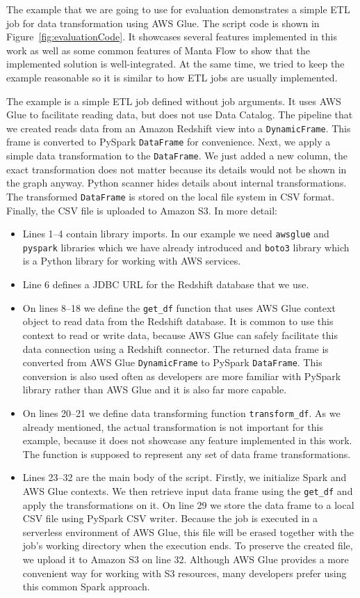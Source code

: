 The example that we are going to use for evaluation demonstrates a simple ETL job for data transformation using AWS Glue. The script code is shown in Figure~\ref{fig:evaluationCode}. It showcases several features implemented in this work as well as some common features of Manta Flow to show that the implemented solution is well-integrated. At the same time, we tried to keep the example reasonable so it is similar to how ETL jobs are usually implemented.
\par
The example is a simple ETL job defined without job arguments. It uses AWS Glue to facilitate reading data, but does not use Data Catalog. The pipeline that we created reads data from an Amazon Redshift view into a \texttt{DynamicFrame}. This frame is converted to PySpark \texttt{DataFrame} for convenience. Next, we apply a simple data transformation to the \texttt{DataFrame}. We just added a new column, the exact transformation does not matter because its details would not be shown in the graph anyway. Python scanner hides details about internal transformations. The transformed \texttt{DataFrame} is stored on the local file system in CSV format. Finally, the CSV file is uploaded to Amazon S3. In more detail:
\begin{itemize}
    \item Lines 1--4 contain library imports. In our example we need \texttt{awsglue} and \texttt{pyspark} libraries which we have already introduced and \texttt{boto3} library which is a Python library for working with AWS services.
    \item Line 6 defines a JDBC URL for the Redshift database that we use.
    \item On lines 8--18 we define the \texttt{get\_df} function that uses AWS Glue context object to read data from the Redshift database. It is common to use this context to read or write data, because AWS Glue can safely facilitate this data connection using a Redshift connector. The returned data frame is converted from AWS Glue \texttt{DynamicFrame} to PySpark \texttt{DataFrame}. This conversion is also used often as developers are more familiar with PySpark library rather than AWS Glue and it is also far more capable.
    \item On lines 20--21 we define data transforming function \texttt{transform\_df}. As we already mentioned, the actual transformation is not important for this example, because it does not showcase any feature implemented in this work. The function is supposed to represent any set of data frame transformations.
    \item Lines 23--32 are the main body of the script. Firstly, we initialize Spark and AWS Glue contexts. We then retrieve input data frame using the \texttt{get\_df} and apply the transformations on it. On line 29 we store the data frame to a local CSV file using PySpark CSV writer. Because the job is executed in a serverless environment of AWS Glue, this file will be erased together with the job's working directory when the execution ends. To preserve the created file, we upload it to Amazon S3 on line 32. Although AWS Glue provides a more convenient way for working with S3 resources, many developers prefer using this common Spark approach. 
\end{itemize}

